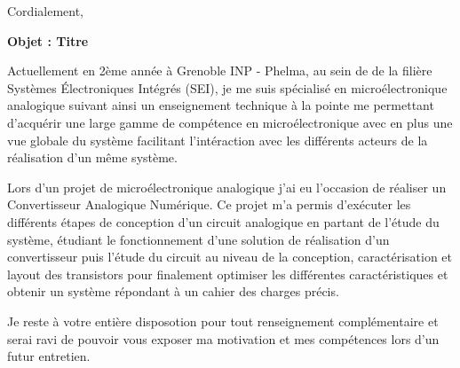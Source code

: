 \documentclass[11pt,a4paper]{moderncv}
\begin{document}

\date{\today} %
\opening{} %
\closing{Cordialement,} %

\makelettertitle %
\justify
\textbf{Objet : Titre}
\newline{}

Actuellement en 2ème année à Grenoble INP - Phelma, au sein de de la filière Systèmes Électroniques Intégrés (SEI), je me suis spécialisé en microélectronique analogique suivant ainsi un enseignement technique à la pointe me permettant d'acquérir une large gamme de compétence en microélectronique avec en plus une vue globale du système facilitant l'intéraction avec les différents acteurs de la réalisation d'un même système.\newline{}

Lors d'un projet de microélectronique analogique j'ai eu l'occasion de réaliser un Convertisseur Analogique Numérique. Ce projet m'a permis d'exécuter les différents étapes de conception d'un circuit analogique en partant de l'étude du système, étudiant le fonctionnement d'une solution de réalisation d'un convertisseur puis l'étude du circuit au niveau de la conception, caractérisation et layout des transistors pour finalement optimiser les différentes caractéristiques et obtenir un système répondant à un cahier des charges précis.\newline{}


Je reste à votre entière disposotion pour tout renseignement complémentaire et serai ravi de pouvoir vous exposer ma motivation et mes compétences lors d'un futur entretien.\newline{}

\makeletterclosing %
\end{document}
